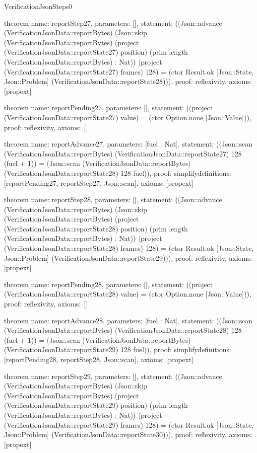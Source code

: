 \begin{lexlean}{VerificationJsonSteps0}
\begin{semanticmodule}
theorem{
  name: reportStep27,
  parameters: [],
  statement: ((Json::advance (VerificationJsonData::reportBytes) (Json::skip (VerificationJsonData::reportBytes) (project (VerificationJsonData::reportState27) position) (prim length (VerificationJsonData::reportBytes) : Nat)) (project (VerificationJsonData::reportState27) frames) 128) = (ctor Result.ok [Json::State, Json::Problem] (VerificationJsonData::reportState28))),
  proof: reflexivity{},
  axioms: [propext]
}

theorem{
  name: reportPending27,
  parameters: [],
  statement: ((project (VerificationJsonData::reportState27) value) = (ctor Option.none [Json::Value])),
  proof: reflexivity{},
  axioms: []
}

theorem{
  name: reportAdvance27,
  parameters: [fuel : Nat],
  statement: ((Json::scan (VerificationJsonData::reportBytes) (VerificationJsonData::reportState27) 128 (fuel + 1)) = (Json::scan (VerificationJsonData::reportBytes) (VerificationJsonData::reportState28) 128 fuel)),
  proof: simplify{definitions: [reportPending27, reportStep27, Json::scan]},
  axioms: [propext]
}

theorem{
  name: reportStep28,
  parameters: [],
  statement: ((Json::advance (VerificationJsonData::reportBytes) (Json::skip (VerificationJsonData::reportBytes) (project (VerificationJsonData::reportState28) position) (prim length (VerificationJsonData::reportBytes) : Nat)) (project (VerificationJsonData::reportState28) frames) 128) = (ctor Result.ok [Json::State, Json::Problem] (VerificationJsonData::reportState29))),
  proof: reflexivity{},
  axioms: [propext]
}

theorem{
  name: reportPending28,
  parameters: [],
  statement: ((project (VerificationJsonData::reportState28) value) = (ctor Option.none [Json::Value])),
  proof: reflexivity{},
  axioms: []
}

theorem{
  name: reportAdvance28,
  parameters: [fuel : Nat],
  statement: ((Json::scan (VerificationJsonData::reportBytes) (VerificationJsonData::reportState28) 128 (fuel + 1)) = (Json::scan (VerificationJsonData::reportBytes) (VerificationJsonData::reportState29) 128 fuel)),
  proof: simplify{definitions: [reportPending28, reportStep28, Json::scan]},
  axioms: [propext]
}

theorem{
  name: reportStep29,
  parameters: [],
  statement: ((Json::advance (VerificationJsonData::reportBytes) (Json::skip (VerificationJsonData::reportBytes) (project (VerificationJsonData::reportState29) position) (prim length (VerificationJsonData::reportBytes) : Nat)) (project (VerificationJsonData::reportState29) frames) 128) = (ctor Result.ok [Json::State, Json::Problem] (VerificationJsonData::reportState30))),
  proof: reflexivity{},
  axioms: [propext]
}


\end{semanticmodule}
\end{lexlean}
